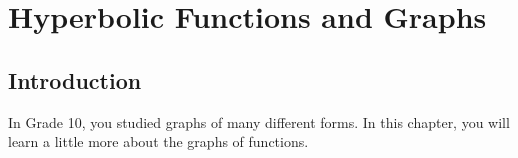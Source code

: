 \chapter{Hyperbolic Functions and Graphs}
\label{m:fg:h11}

\section{Introduction}
In Grade 10, you studied graphs of many different forms. In this chapter, you will learn a little more about the graphs of functions.


